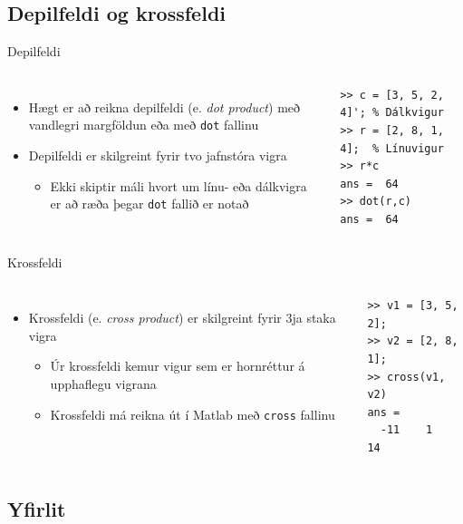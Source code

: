 \documentclass{beamer}
\begin{document}
\subsection{Depilfeldi og krossfeldi}

\begin{frame}[fragile]{Depilfeldi}
\begin{columns}
\begin{itemize}
 \item Hægt er að reikna depilfeldi (e. \emph{dot product}) með vandlegri margföldun eða með \texttt{dot} fallinu
 \item Depilfeldi er skilgreint fyrir tvo jafnstóra vigra
 \begin{itemize}
  \item Ekki skiptir máli hvort um línu- eða dálkvigra er að ræða þegar \texttt{dot} fallið er notað
 \end{itemize}
\end{itemize}
\begin{verbatim}
>> c = [3, 5, 2, 4]'; % Dálkvigur
>> r = [2, 8, 1, 4];  % Línuvigur
>> r*c
ans =  64
>> dot(r,c)
ans =  64
\end{verbatim}
\end{columns}
\end{frame}

\begin{frame}[fragile]{Krossfeldi}
\begin{columns}
\begin{itemize}
 \item Krossfeldi (e. \emph{cross product}) er skilgreint fyrir 3ja staka vigra
 \begin{itemize}
  \item Úr krossfeldi kemur vigur sem er hornréttur á upphaflegu vigrana
  \item Krossfeldi má reikna út í Matlab með \texttt{cross} fallinu
 \end{itemize}
\end{itemize}
\begin{verbatim}
>> v1 = [3, 5, 2];
>> v2 = [2, 8, 1];
>> cross(v1, v2)
ans =
  -11    1   14
\end{verbatim}
\end{columns}
\end{frame}

\subsection{Yfirlit}
\end{document}
